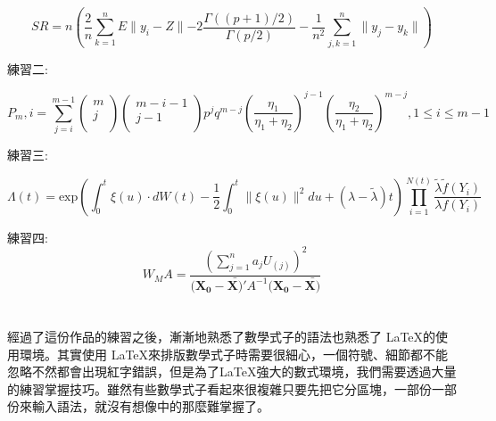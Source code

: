 $$
SR=n\left(\frac{2}{n}\sum_{k=1}^n E\parallel y_i-Z\parallel-2\frac{\Gamma((p+1)/2)}{\Gamma(p/2)}-\frac{1}{n^2} \sum_{j,k=1}^n\parallel y_j-y_k \parallel\right)
$$

練習二:

$$
P_m,i=\sum_{j=i}^{m-1}\begin{pmatrix} m\\ j\\ \end{pmatrix}\begin{pmatrix} m-i-1\\ j-1\\ \end{pmatrix}p^jq^{m-j}\left(\frac{\eta_1}{\eta_1+\eta_2}\right)^{j-1}\left(\frac{\eta_2}{\eta_1+\eta_2}\right)^{m-j},1\leq i\leq m-1
$$

練習三:

$$
\Lambda(t)=\mbox{exp}\left(\int^t_0 \xi(u)\cdot dW(t)-\frac{1}{2}\int^t_0\parallel \xi(u)\parallel^2 du+(\lambda-\tilde{\lambda})t \right)\prod_{i=1}^{N(t)}\frac{\tilde{\lambda}\tilde{f}(Y_i)}{\lambda f(Y_i)}
$$

練習四:
$$
W_MA=\frac{(\sum_{j=1}^na_j U_{(j)})^2}{(\mathbf{X_0}-\bar{\mathbf{X})}'A^{-1}(\mathbf{X_0}-\bar{\mathbf{X})}}
$$
\section*{}
經過了這份作品的練習之後，漸漸地熟悉了數學式子的語法也熟悉了 \LaTeX 的使用環境。其實使用 \LaTeX 來排版數學式子時需要很細心，一個符號、細節都不能忽略不然都會出現紅字錯誤，但是為了\LaTeX 強大的數式環境，我們需要透過大量的練習掌握技巧。雖然有些數學式子看起來很複雜只要先把它分區塊，一部份一部份來輸入語法，就沒有想像中的那麼難掌握了。

%